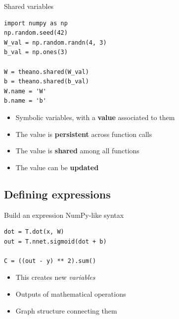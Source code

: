 \documentclass[a4paper,9pt]{beamer}
\begin{document}
\begin{frame}[fragile]{Shared variables}
  \begin{verbatim}
import numpy as np
np.random.seed(42)
W_val = np.random.randn(4, 3)
b_val = np.ones(3)

W = theano.shared(W_val)
b = theano.shared(b_val)
W.name = 'W'
b.name = 'b'
  \end{verbatim}
  \begin{itemize}
    \item Symbolic variables, with a \textbf{value} associated to them
    \item The value is \textbf{persistent} across function calls
    \item The value is \textbf{shared} among all functions
    \item The value can be \textbf{updated}
  \end{itemize}
\end{frame}

\subsection{Defining expressions}
\begin{frame}[fragile]{Build an expression}
  NumPy-like syntax
  \begin{verbatim}
dot = T.dot(x, W)
out = T.nnet.sigmoid(dot + b)

C = ((out - y) ** 2).sum()
  \end{verbatim}

  \begin{itemize}
    \item This creates new \emph{variables}
    \item Outputs of mathematical operations
    \item Graph structure connecting them
  \end{itemize}
\end{frame}
\end{document}

